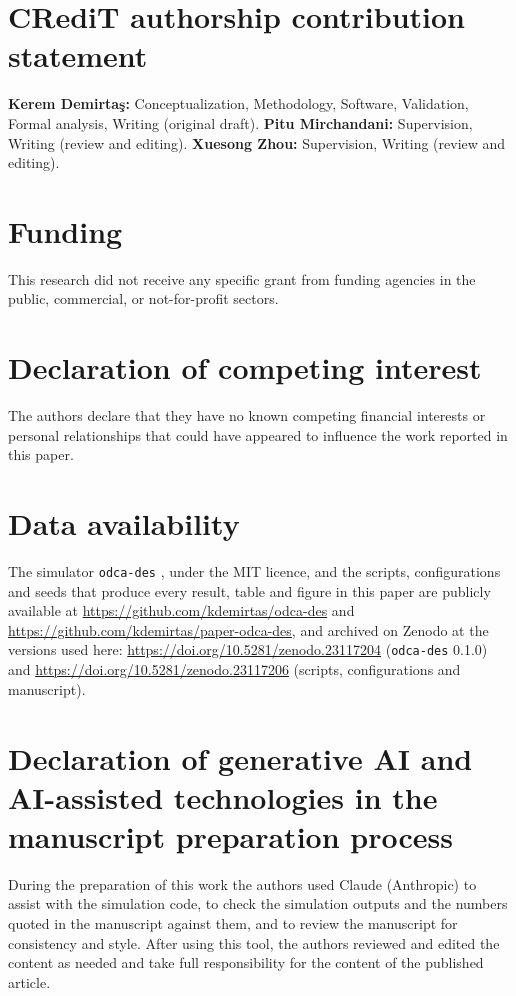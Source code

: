 \documentclass[review,authoryear]{elsarticle}
\begin{document}
\section*{CRediT authorship contribution statement}
\textbf{Kerem Demirta\c{s}:} Conceptualization, Methodology, Software, Validation, Formal analysis, Writing (original draft).
\textbf{Pitu Mirchandani:} Supervision, Writing (review and editing).
\textbf{Xuesong Zhou:} Supervision, Writing (review and editing).

\section*{Funding}
This research did not receive any specific grant from funding agencies in the public, commercial, or not-for-profit sectors.

\section*{Declaration of competing interest}
The authors declare that they have no known competing financial interests or personal relationships that could have appeared to influence the work reported in this paper.

\section*{Data availability}
The simulator \texttt{odca-des} \citep{demirtas2026odcades}, under the MIT licence, and the scripts, configurations and seeds that produce every result, table and figure in this paper are publicly available at \url{https://github.com/kdemirtas/odca-des} and \url{https://github.com/kdemirtas/paper-odca-des}, and archived on Zenodo at the versions used here: \url{https://doi.org/10.5281/zenodo.23117204} (\texttt{odca-des} 0.1.0) and \url{https://doi.org/10.5281/zenodo.23117206} (scripts, configurations and manuscript).

\section*{Declaration of generative AI and AI-assisted technologies in the manuscript preparation process}
During the preparation of this work the authors used Claude (Anthropic) to assist with the simulation code, to check the simulation outputs and the numbers quoted in the manuscript against them, and to review the manuscript for consistency and style. After using this tool, the authors reviewed and edited the content as needed and take full responsibility for the content of the published article.



\end{document}
